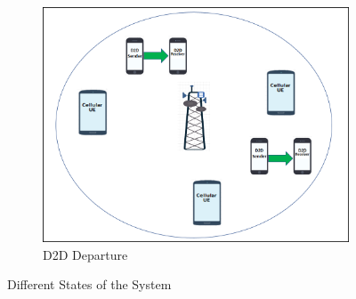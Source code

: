 \documentclass[times]{dacauth}
\begin{document}
\begin{figure}[t]
{{%
			\begin{subfigure}{0.33\linewidth}
				\centering
				\includegraphics[width=\linewidth]{Graph/s5.png}
				\caption{D2D Departure}
				\label{fig:D2D departure}
			\end{subfigure}
			
		}
	}%
	\vspace{-0.2cm}
	\caption{Different States of the System}
	\label{fig:State of the System}
\end{figure}  

\end{document}

